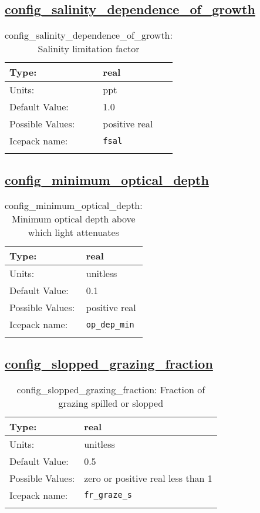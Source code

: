 \subsection[config\_salinity\_dependence\_of\_growth]{\hyperref[sec:nm_tab_biogeochemistry]{config\_salinity\_dependence\_of\_growth}}
\label{subsec:nm_sec_config_salinity_dependence_of_growth}
\begin{center}
\begin{longtable}{| p{2.0in} || p{4.0in} |}
    \hline
    Type: & real \\
    \hline
    Units: & \si{ppt} \\
    \hline
    Default Value: & 1.0 \\
    \hline
    Possible Values: & positive real \\
    \hline
    Icepack name: & \verb+fsal+ \\
    \hline
    \caption{config\_salinity\_dependence\_of\_growth: Salinity limitation factor}
\end{longtable}
\end{center}
\subsection[config\_minimum\_optical\_depth]{\hyperref[sec:nm_tab_biogeochemistry]{config\_minimum\_optical\_depth}}
\label{subsec:nm_sec_config_minimum_optical_depth}
\begin{center}
\begin{longtable}{| p{2.0in} || p{4.0in} |}
    \hline
    Type: & real \\
    \hline
    Units: & \si{unitless} \\
    \hline
    Default Value: & 0.1 \\
    \hline
    Possible Values: & positive real \\
    \hline
    Icepack name: & \verb+op_dep_min+ \\
    \hline
    \caption{config\_minimum\_optical\_depth: Minimum optical depth above which light attenuates}
\end{longtable}
\end{center}
\subsection[config\_slopped\_grazing\_fraction]{\hyperref[sec:nm_tab_biogeochemistry]{config\_slopped\_grazing\_fraction}}
\label{subsec:nm_sec_config_slopped_grazing_fraction}
\begin{center}
\begin{longtable}{| p{2.0in} || p{4.0in} |}
    \hline
    Type: & real \\
    \hline
    Units: & \si{unitless} \\
    \hline
    Default Value: & 0.5 \\
    \hline
    Possible Values: & zero or positive real less than 1 \\
    \hline
    Icepack name: & \verb+fr_graze_s+ \\
    \hline
    \caption{config\_slopped\_grazing\_fraction: Fraction of grazing spilled or slopped}
\end{longtable}
\end{center}
